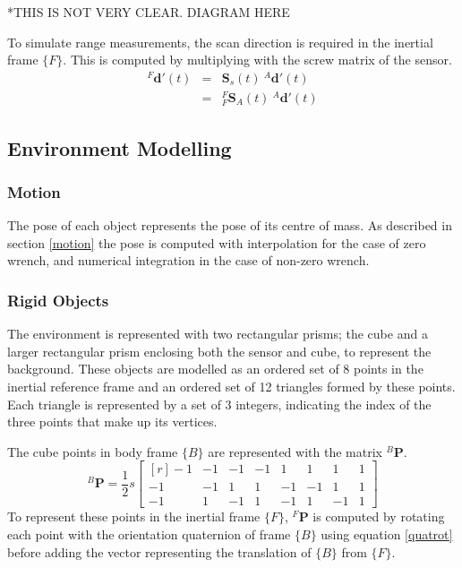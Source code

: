 *THIS IS NOT VERY CLEAR. DIAGRAM HERE

To simulate range measurements, the scan direction is required in the inertial frame $\{F\}$. This is computed by multiplying with the screw matrix of the sensor.
\begin{equation}
	\begin{array}{lcl}
	{^{F}\mathbf{d'}(t)} & = & \mathbf{S}_s(t)\:{^{A}\mathbf{d'}(t)} \\
	& = & {^{F}_{F}\mathbf{S}^{}_{A}(t)}\:{^{A}\mathbf{d'}(t)}
	\end{array}
\end{equation}

\subsection{Environment Modelling}
\subsubsection{Motion}
The pose of each object represents the pose of its centre of mass. As described in section \ref{motion} the pose is computed with interpolation for the case of zero wrench, and numerical integration in the case of non-zero wrench.

\subsubsection{Rigid Objects}
The environment is represented with two rectangular prisms; the cube and a larger rectangular prism enclosing both the sensor and cube, to represent the background. These objects are modelled as an ordered set of 8 points in the inertial reference frame and an ordered set of 12 triangles formed by these points. Each triangle is represented by a set of 3 integers, indicating the index of the three points that make up its vertices.

The cube points in body frame $\{B\}$ are represented with the matrix ${^{B}\mathbf{P}}$.
\begin{equation}
	{^{B}\mathbf{P}} = \frac{1}{2}s
	\begin{bmatrix*}[r]
		-1  &  -1  &  -1  &  -1  &   1  &   1  &   1  &  1 \\
		-1  &  -1  &   1  &   1  &  -1  &  -1  &   1  &  1 \\
		-1  &   1  &  -1  &   1  &  -1  &   1  &  -1  &  1 
	\end{bmatrix*}
\end{equation}
To represent these points in the inertial frame $\{F\}$, ${^{F}\mathbf{P}}$ is computed by rotating each point with the orientation quaternion of frame $\{B\}$ using equation \ref{quatrot} before adding the vector representing the translation of $\{B\}$ from $\{F\}$.

